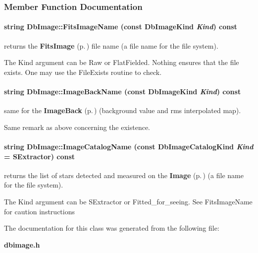 \subsubsection{Member Function Documentation}
\paragraph{\setlength{\rightskip}{0pt plus 5cm}string Db\-Image::Fits\-Image\-Name (const Db\-Image\-Kind {\em Kind}) const}\hfill\label{class_dbimage_a8}


returns the {\bf Fits\-Image} {\rm (p.\,\pageref{class_fitsimage})} file name (a file name for the file system).

The Kind argument can be Raw or Flat\-Fielded. Nothing ensures that the file exists. One may use the File\-Exists routine  to check. 
\paragraph{\setlength{\rightskip}{0pt plus 5cm}string Db\-Image::Image\-Back\-Name (const Db\-Image\-Kind {\em Kind}) const}\hfill\label{class_dbimage_a10}


same for the {\bf Image\-Back} {\rm (p.\,\pageref{class_imageback})} (background value and rms interpolated map).

Same remark as above concerning the existence. 
\paragraph{\setlength{\rightskip}{0pt plus 5cm}string Db\-Image::Image\-Catalog\-Name (const Db\-Image\-Catalog\-Kind {\em Kind} = SExtractor) const}\hfill\label{class_dbimage_a24}


returns the list of stars detected and measured on the {\bf Image} {\rm (p.\,\pageref{class_image})} (a file name for the file system).

The Kind argument can be SExtractor or Fitted\_\-for\_\-seeing.  See Fits\-Image\-Name for caution instructions 

The documentation for this class was generated from the following file:\begin{CompactItemize}
\item 
{\bf dbimage.h}\end{CompactItemize}
